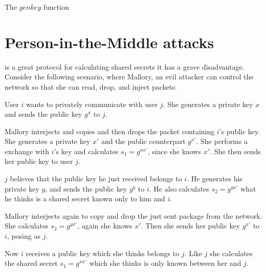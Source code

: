\begin{algorithm}[h]
  \caption{The $genkey$ function}
  \label{algo:dh_calculate_secret}
\end{algorithm}

\section{Person-in-the-Middle attacks}

\dhname is a great protocol for calculating shared secrets it has a grave disadvantage.
Consider the following scenario, where Mallory, an evil attacker can control the network so that she can read, drop, and inject packets:

User $i$ wants to privately communicate with user $j$.
She generates a private key $x$ and sends the public key $g^x$ to $j$.

Mallory interjects and copies and then drops the packet containing $i$'s public key.
She generates a private key $x\prime$ and the public counterpart $g^{x\prime}$.
She performs a \dhname exchange with $i$'s key and calculates $s_1 = g^{xx\prime}$, since she knows $x\prime$.
She then sends her public key to user $j$.

$j$ believes that the public key he just received belongs to $i$.
He generates his private key $y$, and sends the public key $g^y$ to $i$.
He also calculates $s_2 = g^{yx\prime}$ what he thinks is a shared secret known only to him and $i$.

Mallory interjects again to copy and drop the just sent package from the network.
She calculates $s_2 = g^{yx\prime}$, again she knows $x\prime$.
Then she sends her public key $g^{x\prime}$ to $i$, posing as $j$.

Now $i$ receives a public key which she thinks belongs to $j$.
Like $j$ she calculates the shared secret $s_1 = g^{xx\prime}$ which she thinks is only known between her and $j$.


